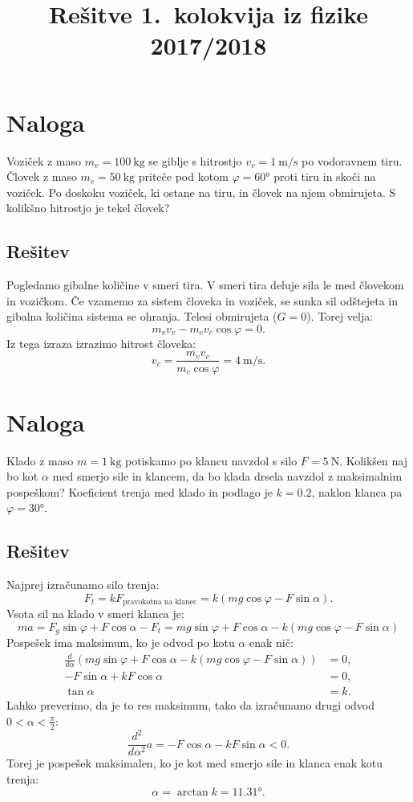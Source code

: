 \documentclass[a4,11pt]{article}
\title{Rešitve 1.~kolokvija iz fizike 2017/2018}
\author{}
\date{}
\begin{document}
\maketitle

\section{Naloga}
    Voziček z maso \(m_v = \qty{100}{\kg}\) se giblje s hitrostjo \(v_v = \qty{1}{\m\per\s}\) po vodoravnem tiru. Človek z maso \(m_c = \qty{50}{\kg}\)
    priteče pod kotom \(\varphi = \ang{60}\) proti tiru in skoči na voziček. Po doskoku voziček, ki ostane na tiru,
    in človek na njem obmirujeta. S kolikšno hitrostjo je tekel človek?

\subsection*{Rešitev}
    Pogledamo gibalne količine v smeri tira.
    V smeri tira deluje sila le med človekom in vozičkom. Če vzamemo za sistem človeka in voziček, se sunka sil odštejeta
    in gibalna količina sistema se ohranja. Telesi obmirujeta (\(G = 0\)). Torej velja:
    \[m_v v_v - m_c v_c \cos\varphi = 0.\]
    Iz tega izraza izrazimo hitrost človeka:
    \[v_c = \frac{m_v v_v}{m_c \cos\varphi} = \qty{4}{\m\per\s}.\]

\section{Naloga}
    Klado z maso \(m = \qty{1}{\kg}\) potiskamo po klancu navzdol s silo \(F = \qty{5}{\N}\). Kolikšen naj bo kot \(\alpha\) med smerjo
    sile in klancem, da bo klada drsela navzdol z maksimalnim pospeškom? Koeficient trenja
    med klado in podlago je \(k = 0.2\), naklon klanca pa \(\varphi = \ang{30}\).

\subsection*{Rešitev}
    Najprej izračunamo silo trenja:
    \[F_t = k F_{\text{pravokotna na klanec}} = k \left(m g \cos\varphi - F \sin \alpha\right).\]
    Vsota sil na klado v smeri klanca je:
    \[ma = F_g \sin\varphi + F \cos\alpha - F_t = mg\sin\varphi + F\cos\alpha - k \left(m g \cos\varphi - F \sin \alpha\right)\]
    Pospešek ima maksimum, ko je odvod po kotu \(\alpha\) enak nič:
    \begin{align*}
        \frac{d}{d\alpha} \left(mg\sin\varphi + F\cos\alpha - k \left(m g \cos\varphi - F \sin \alpha\right)\right) &= 0, \\
        -F\sin\alpha + kF\cos\alpha &= 0, \\
        \tan\alpha &= k.
    \end{align*}
    Lahko preverimo, da je to res maksimum, tako da izračunamo drugi odvod \(0 < \alpha < \frac{\pi}{2}\):
    \[\frac{d^2}{d\alpha^2} a = -F\cos\alpha - kF\sin\alpha < 0.\]
    Torej je pospešek maksimalen, ko je kot med smerjo sile in klanca enak kotu trenja:
    \[\alpha = \arctan k = \ang{11.31}.\]
\end{document}
